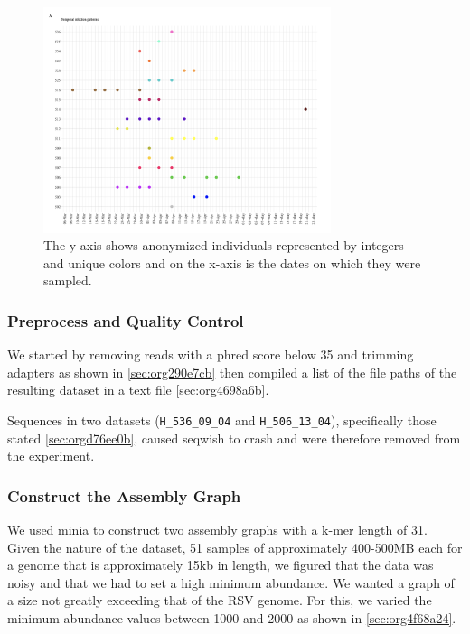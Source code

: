 \documentclass[10pt, a4paper]{article}
\begin{document}
\begin{figure}[h]
\centering
\includegraphics[width=0.75\textwidth]{../Figures/RSV/Githinji_HH_5_temporal_distribution.png}
\caption[Temporal Distribution of RSV Sample Collection]{\label{fig:org4973737}
The y-axis shows anonymized individuals represented by integers and unique colors and on the x-axis is the dates on which they were sampled.}
\end{figure}

\subsubsection{Preprocess and Quality Control}
\label{sec:orgb5274ec}
We started by removing reads with a phred score below 35 and trimming adapters
as shown in \ref{sec:org290e7cb} then compiled a list of the file paths of the resulting 
dataset in a text file \ref{sec:org4698a6b}.

Sequences in two datasets (\texttt{H\_536\_09\_04} and \texttt{H\_506\_13\_04}), specifically those 
stated \ref{sec:orgd76ee0b}, caused seqwish to crash and were therefore removed from the 
experiment.

\subsubsection{Construct the Assembly Graph}
\label{sec:orga001b15}
We used minia \cite{chikhiSpaceefficientExactBruijn2013} to construct two assembly
graphs with a k-mer length of 31.
Given the nature of the dataset, 51 samples of approximately 400-500MB each for 
a genome that is approximately 15kb in length, we figured that the data was 
noisy and that we had to set a high minimum abundance. 
We wanted a graph of a size not greatly exceeding that of the RSV genome.
For this, we varied the minimum abundance values between 1000 and 2000 as shown 
in \ref{sec:org4f68a24}. 
\end{document}
